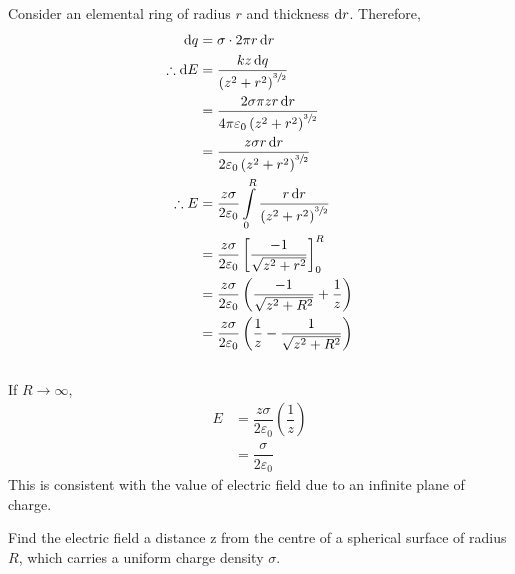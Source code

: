 \documentclass[fleqn, a4paper, 12pt, oneside]{amsart}
\theoremstyle{definition}
\theoremstyle{theorem}
\begin{document}
\begin{solution}
	Consider an elemental ring of radius $r$ and thickness $\dif r$.
	Therefore,
	\begin{align*}
		\dif q &= \sigma \cdot 2 \pi r \dif r\\
		\therefore \dif E &= \dfrac{k z \dif q}{\left( z^2 + r^2 \right)^{\sfrac{3}{2}}}\\
		&= \dfrac{2 \sigma \pi z r \dif r}{4 \pi \varepsilon_0 \left( z^2 + r^2 \right)^{\sfrac{3}{2}}}\\
		&= \dfrac{z \sigma r \dif r}{2 \varepsilon_0 \left( z^2 + r^2 \right)^{\sfrac{3}{2}}}\\
		\therefore E &= \dfrac{z \sigma}{2 \varepsilon_0} \int\limits_{0}^{R} \dfrac{r \dif r}{\left( z^2 + r^2 \right)^{\sfrac{3}{2}}}\\
		&= \dfrac{z \sigma}{2 \varepsilon_0} \left[ \dfrac{-1}{\sqrt{z^2 + r^2}} \right]_{0}^{R}\\
		&= \dfrac{z \sigma}{2 \varepsilon_0} \left( \dfrac{-1}{\sqrt{z^2 + R^2}} + \dfrac{1}{z} \right)\\
		&= \dfrac{z \sigma}{2 \varepsilon_0} \left( \dfrac{1}{z} - \dfrac{1}{\sqrt{z^2 + R^2}} \right)
	\end{align*}
	~\\
	If $R \to \infty$,
	\begin{align*}
		E &= \dfrac{z \sigma}{2 \varepsilon_0} \left( \dfrac{1}{z} \right)\\
		&= \dfrac{\sigma}{2 \varepsilon_0}
	\end{align*}
	This is consistent with the value of electric field due to an infinite plane of charge.
\end{solution}

\begin{question}
	Find the electric field a distance z from the centre of a spherical surface of radius $R$, which carries a uniform charge density $\sigma$.
\end{question}
\end{document}
